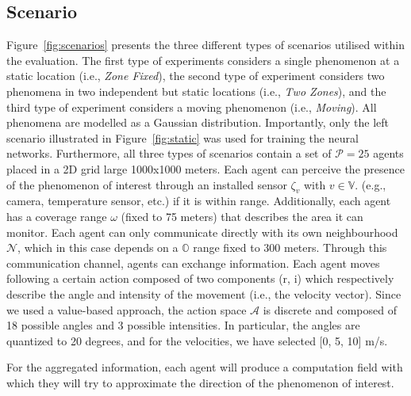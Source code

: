 \documentclass[conference]{IEEEtran}
\begin{document}
\subsection{Scenario}
Figure~\ref{fig:scenarios} presents the three different types of scenarios utilised within the evaluation. The first type of experiments considers a single phenomenon at a static location (i.e., \emph{Zone Fixed}), the second type of experiment considers two phenomena in two independent but static locations (i.e., \emph{Two Zones}), and the third type of experiment considers a moving phenomenon (i.e., \emph{Moving}). All phenomena are modelled as a Gaussian distribution. Importantly, only the left scenario illustrated in Figure~\ref{fig:static} was used for training the neural networks. 
Furthermore, all three types of scenarios contain a set of $\mathcal{P} = 25$ agents placed in a 2D grid large 1000x1000 meters. %
Each agent can perceive the presence
 of the phenomenon of interest through an installed sensor $\zeta_v$ with $v \in \mathbb{V}$. 
 (e.g., camera, temperature sensor, etc.) if it is within range.
%
Additionally, each agent has a coverage range $\omega$ (fixed to 75 meters) 
 that describes the area it can monitor. 
 Each agent can only communicate directly with its own neighbourhood $\mathcal{N}$, 
 which in this case depends on a $\mathbb{O}$ range fixed to 300 meters. %
Through this communication channel, agents can exchange information. 
%
Each agent moves following a certain action composed of two components (r, i) 
 which respectively describe the angle and intensity of the movement (i.e., the velocity vector).
Since we used a value-based approach, 
 the action space $\mathcal{A}$ is discrete and composed of 18 possible angles and 3 possible intensities.
In particular, the angles are quantized to 20 degrees, and for the velocities, we have selected [0, 5, 10] m/s.
%

For the aggregated information, each agent will produce a computation field with which they will try to approximate the direction of the phenomenon of interest. 
%
\end{document}
